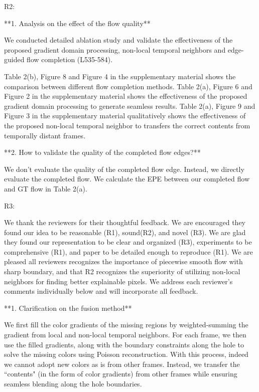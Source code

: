 \documentclass[runningheads]{llncs}
\begin{document}
R2:

**1. Analysis on the effect of the flow quality**

We conducted detailed ablation study and validate the effectiveness of the proposed gradient domain processing, non-local temporal neighbors and edge-guided flow completion (L535-584). 

Table 2(b), Figure 8 and Figure 4 in the supplementary material shows the comparison between different flow completion methods.
Table 2(a), Figure 6 and Figure 2 in the supplementary material shows the effectiveness of the proposed gradient domain processing to generate seamless results.
Table 2(a), Figure 9 and Figure 3 in the supplementary material qualitatively shows the effectiveness of the proposed non-local temporal neighbor to transfers the correct contents from temporally distant frames.




**2. How to validate the quality of the completed flow edges?**

We don't evaluate the quality of the completed flow edge.
Instead, we directly evaluate the completed flow. 
We calculate the EPE between our completed flow and GT flow in Table 2(a).








R3:

We thank the reviewers for their thoughtful feedback. We are encouraged they found our idea to be reasonable (R1), sound(R2), and novel (R3). We are glad they found our representation to be clear and organized (R3), experiments to be comprehensive (R1), and paper to be detailed enough to reproduce (R1). We are pleased all reviewers recognizes the importance of piecewise smooth flow with sharp boundary, and that R2 recognizes the superiority of utilizing non-local neighbors for finding better explainable pixels. We address each reviewer's comments individually below and will incorporate all feedback.


**1. Clarification on the fusion method**

We first fill the color gradients of the missing regions by weighted-summing the gradient from local and non-local temporal neighbors.
For each frame, we then use the filled gradients, along with the boundary constraints along the hole to solve the missing colors using Poisson reconstruction.
With this process, indeed we cannot adopt new colors as is from other frames. 
Instead, we transfer the ``contents" (in the form of color gradients) from other frames while ensuring seamless blending along the hole boundaries.
\end{document}
